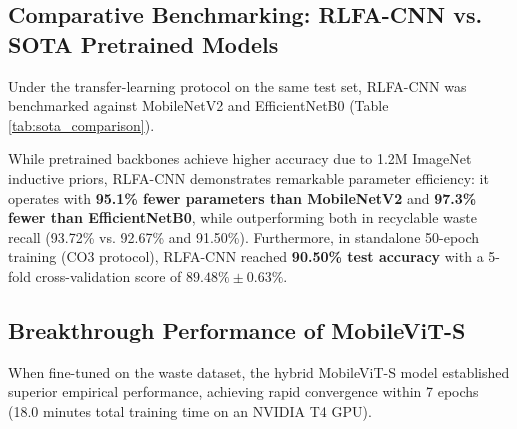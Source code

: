 \documentclass[conference]{IEEEtran}
\begin{document}
\subsection{Comparative Benchmarking: RLFA-CNN vs. SOTA Pretrained Models}
Under the transfer-learning protocol on the same test set, RLFA-CNN was benchmarked against MobileNetV2 and EfficientNetB0 (Table \ref{tab:sota_comparison}).

\begin{table}[htbp]
\caption{Comparison Against Transfer-Learning Benchmarks}
\label{tab:sota_comparison}
\centering
{}
\end{table}

While pretrained backbones achieve higher accuracy due to 1.2M ImageNet inductive priors, RLFA-CNN demonstrates remarkable parameter efficiency: it operates with \textbf{95.1\% fewer parameters than MobileNetV2} and \textbf{97.3\% fewer than EfficientNetB0}, while outperforming both in recyclable waste recall (93.72\% vs. 92.67\% and 91.50\%). Furthermore, in standalone 50-epoch training (CO3 protocol), RLFA-CNN reached \textbf{90.50\% test accuracy} with a 5-fold cross-validation score of $89.48\% \pm 0.63\%$.

\subsection{Breakthrough Performance of MobileViT-S}
When fine-tuned on the waste dataset, the hybrid MobileViT-S model established superior empirical performance, achieving rapid convergence within 7 epochs (18.0 minutes total training time on an NVIDIA T4 GPU).
\end{document}
